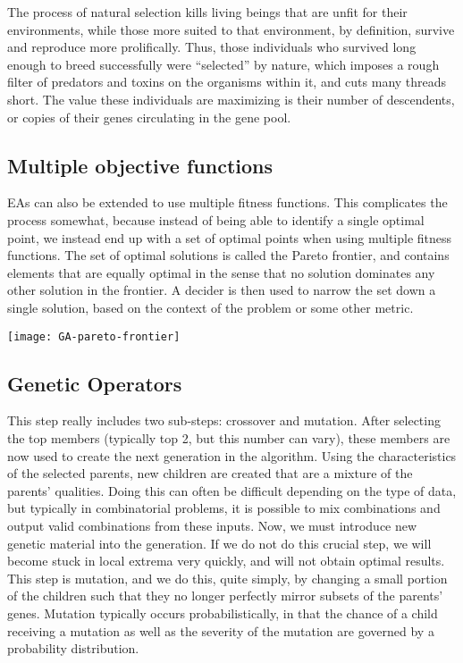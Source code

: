 The process of natural selection kills living beings that are unfit for their environments, while those more suited to that environment, by definition, survive and reproduce more prolifically. Thus, those individuals who survived long enough to breed successfully were “selected” by nature, which imposes a rough filter of predators and toxins on the organisms within it, and cuts many threads short. The value these individuals are maximizing is their number of descendents, or copies of their genes circulating in the gene pool.



\subsection{Multiple objective functions}

EAs can also be extended to use multiple fitness functions. This complicates the process somewhat, because instead of being able to identify a single optimal point, we instead end up with a set of optimal points when using multiple fitness functions. The set of optimal solutions is called the Pareto frontier, and contains elements that are equally optimal in the sense that no solution dominates any other solution in the frontier. A decider is then used to narrow the set down a single solution, based on the context of the problem or some other metric.


\begin{marginfigure}
\texttt{[image: GA-pareto-frontier]}
\end{marginfigure}


\subsection{Genetic Operators}

This step really includes two sub-steps: crossover and mutation. After selecting the top members (typically top 2, but this number can vary), these members are now used to create the next generation in the algorithm. Using the characteristics of the selected parents, new children are created that are a mixture of the parents’ qualities. Doing this can often be difficult depending on the type of data, but typically in combinatorial problems, it is possible to mix combinations and output valid combinations from these inputs. Now, we must introduce new genetic material into the generation. If we do not do this crucial step, we will become stuck in local extrema very quickly, and will not obtain optimal results. This step is mutation, and we do this, quite simply, by changing a small portion of the children such that they no longer perfectly mirror subsets of the parents’ genes. Mutation typically occurs probabilistically, in that the chance of a child receiving a mutation as well as the severity of the mutation are governed by a probability distribution.

